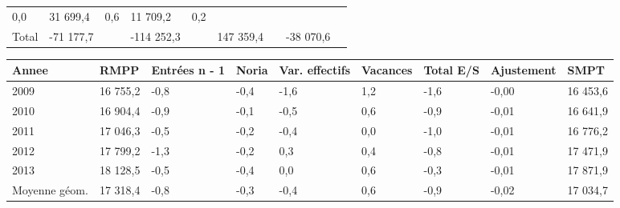 \begin{longtable}[]{@{}lllllllll@{}}
\begin{minipage}[t]{0.06\columnwidth}
0,0\strut
\end{minipage} & \begin{minipage}[t]{0.12\columnwidth}\raggedright
31 699,4\strut
\end{minipage} & \begin{minipage}[t]{0.06\columnwidth}\raggedright
0,6\strut
\end{minipage} & \begin{minipage}[t]{0.08\columnwidth}\raggedright
11 709,2\strut
\end{minipage} & \begin{minipage}[t]{0.06\columnwidth}\raggedright
0,2\strut
\end{minipage}\tabularnewline
\begin{minipage}[t]{0.05\columnwidth}\raggedright
Total\strut
\end{minipage} & \begin{minipage}[t]{0.10\columnwidth}\raggedright
-71 177,7\strut
\end{minipage} & \begin{minipage}[t]{0.06\columnwidth}\raggedright
\strut
\end{minipage} & \begin{minipage}[t]{0.17\columnwidth}\raggedright
-114 252,3\strut
\end{minipage} & \begin{minipage}[t]{0.06\columnwidth}\raggedright
\strut
\end{minipage} & \begin{minipage}[t]{0.12\columnwidth}\raggedright
147 359,4\strut
\end{minipage} & \begin{minipage}[t]{0.06\columnwidth}\raggedright
\strut
\end{minipage} & \begin{minipage}[t]{0.08\columnwidth}\raggedright
-38 070,6\strut
\end{minipage} & \begin{minipage}[t]{0.06\columnwidth}\raggedright
\strut
\end{minipage}\tabularnewline
\bottomrule
\end{longtable}

\begin{longtable}[]{@{}lllllllll@{}}
\toprule
Annee & RMPP & Entrées n - 1 & Noria & Var. effectifs & Vacances & Total
E/S & Ajustement & SMPT\tabularnewline
\midrule
\endhead
2009 & 16 755,2 & -0,8 & -0,4 & -1,6 & 1,2 & -1,6 & -0,00 & 16
453,6\tabularnewline
2010 & 16 904,4 & -0,9 & -0,1 & -0,5 & 0,6 & -0,9 & -0,01 & 16
641,9\tabularnewline
2011 & 17 046,3 & -0,5 & -0,2 & -0,4 & 0,0 & -1,0 & -0,01 & 16
776,2\tabularnewline
2012 & 17 799,2 & -1,3 & -0,2 & 0,3 & 0,4 & -0,8 & -0,01 & 17
471,9\tabularnewline
2013 & 18 128,5 & -0,5 & -0,4 & 0,0 & 0,6 & -0,3 & -0,01 & 17
871,9\tabularnewline
Moyenne géom. & 17 318,4 & -0,8 & -0,3 & -0,4 & 0,6 & -0,9 & -0,02 & 17
034,7\tabularnewline
\bottomrule
\end{longtable}

